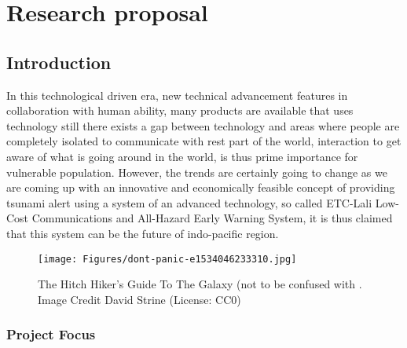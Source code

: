 
\chapter{Research proposal}\label{chapter:firstchapter} %

\label{ChapterX} %


\section{Introduction}\label{sec:firstsection}


In this technological driven era, new technical advancement features in collaboration with human ability, many products are available that uses technology  still there exists a gap between technology and  areas where people are completely isolated to communicate with rest part of the world, interaction to get aware of what is going around in the world, is thus prime importance for vulnerable population. However, the trends are certainly going to change as we are coming up with an innovative and economically feasible concept of providing tsunami alert using a system of an advanced technology, so called ETC-Lali Low-Cost Communications and All-Hazard Early Warning System, it is thus claimed that this system can be the future of indo-pacific region.

\begin{figure}
\begin{centering}
\texttt{[image: Figures/dont-panic-e1534046233310.jpg]}
\caption{The Hitch Hiker's Guide To The Galaxy (not to be confused with \cite{Reference1}. Image Credit David Strine (License: CC0)}
\label{fig:ThisFig}
\end{centering}
\end{figure}

\subsection{Project Focus  }


